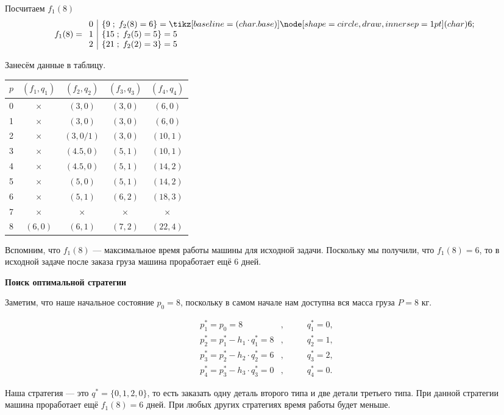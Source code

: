 \begin{enumerate}
	Посчитаем $f_1(8)$
	\[
	f_1(8) = \begin{array}{c|l}
		0 & \{9 \; ; \; f_2(8) = 6\} = \circled{6} \\
		1 & \{15 \; ; \; f_2(5) = 5\} = 5 \\
		2 & \{21 \; ; \; f_2(2) = 3\} = 5
	\end{array}
	\]
	
	Занесём данные в таблицу.
	
	\begin{table}[H]
		\centering
		\begin{tabular}{ | c | c | c | c | c | } 
			\hline
			$p$ & $(f_1, q_1)$ & $(f_2, q_2)$ & $(f_3, q_3)$ & $(f_4, q_4)$ \\ 
			\hline
			0 & $\times$ & $(3, 0)$   & $(3, 0)$ & $(6, 0)$ \\\hline
			1 & $\times$ & $(3, 0)$   & $(3, 0)$ & $(6, 0)$ \\\hline
			2 & $\times$ & $(3, 0/1)$ & $(3, 0)$ & $(10, 1)$ \\\hline
			3 & $\times$ & $(4.5, 0)$ & $(5, 1)$ & $(10, 1)$ \\\hline
			4 & $\times$ & $(4.5, 0)$ & $(5, 1)$ & $(14, 2)$ \\\hline
			5 & $\times$ & $(5, 0)$   & $(5, 1)$ & $(14, 2)$ \\\hline
			6 & $\times$ & $(5, 1)$   & $(6, 2)$ & $(18, 3)$ \\\hline
			7 & $\times$ & $\times$   & $\times$ & $\times$ \\\hline
			8 & $(6, 0)$ & $(6, 1)$   & $(7, 2)$ & $(22, 4)$ \\\hline
		\end{tabular}
	\end{table}
	
	Вспомним, что $f_1(8)$ --- максимальное время работы машины для исходной задачи. Поскольку мы получили, что $f_1(8) = 6$, то в исходной задаче после заказа груза машина проработает ещё 6 дней.
	
	\bigskip
	
	\textbf{Поиск оптимальной стратегии}
	
	Заметим, что наше начальное состояние $p_0 = 8$, поскольку в самом начале нам доступна вся масса груза $P = 8$ кг.
	
	\begin{align*}
		p_1^* = p_0 = 8&, \qquad &q_1^* = 0, \\
		p_2^* = p_1^* - h_1 \cdot q_1^* = 8 &, &q_2^* = 1, \\
		p_3^* = p_2^* - h_2 \cdot q_2^* = 6&, &q_3^* = 2, \\
		p_4^* = p_3^* - h_3 \cdot q_3^* = 0&, &q_4^* = 0.
	\end{align*}
	
	Наша стратегия --- это $q^* = \{0, 1, 2, 0\}$, то есть заказать одну деталь второго типа и две детали третьего типа. При данной стратегии машина проработает ещё $f_1(8) = 6$ дней. При любых других стратегиях время работы будет меньше.
\end{enumerate}

